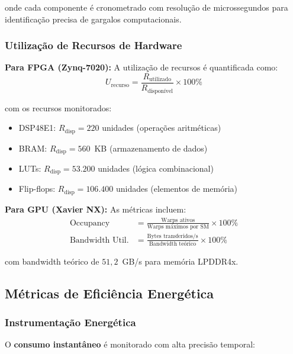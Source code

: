 onde cada componente é cronometrado com resolução de microssegundos para 
identificação precisa de gargalos computacionais.

\subsubsection{Utilização de Recursos de Hardware}

\textbf{Para FPGA (Zynq-7020):} A utilização de recursos é quantificada como:
\begin{equation}
U_{\text{recurso}} = \frac{R_{\text{utilizado}}}{R_{\text{disponível}}} \times 100\% 
\label{eq:utilizacao_fpga}
\end{equation}

com os recursos monitorados:
\begin{itemize}
    \item DSP48E1: $R_{\text{disp}} = 220$ unidades (operações aritméticas)
    \item BRAM: $R_{\text{disp}} = 560$~KB (armazenamento de dados)
    \item LUTs: $R_{\text{disp}} = 53{.}200$ unidades (lógica combinacional)
    \item Flip-flops: $R_{\text{disp}} = 106{.}400$ unidades (elementos de memória)
\end{itemize}

\textbf{Para GPU (Xavier NX):} As métricas incluem:
\begin{align}
\text{Occupancy} &= \frac{\text{Warps ativos}}{\text{Warps máximos por SM}} \times 100\% \label{eq:occupancy} \\
\text{Bandwidth Util.} &= \frac{\text{Bytes transferidos/s}}{\text{Bandwidth teórico}} \times 100\% \label{eq:bandwidth}
\end{align}

com bandwidth teórico de $51{,}2$~GB/s para memória LPDDR4x.

\subsection{Métricas de Eficiência Energética}\label{subsec:metricas_energetica}

\subsubsection{Instrumentação Energética}

O \textbf{consumo instantâneo} é monitorado com alta precisão temporal:

